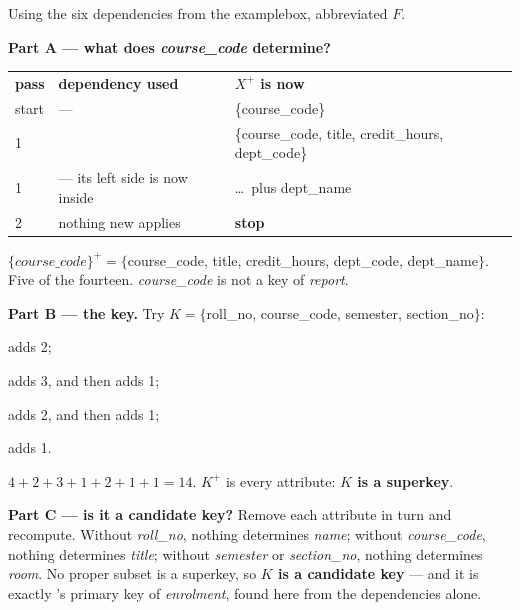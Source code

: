 \begin{worked}
Using the six dependencies from the examplebox, abbreviated
$F$.

\medskip
\textbf{Part A --- what does \textit{course\_code} determine?}

\smallskip
\begin{tabular}{@{}L{1.4cm}L{6.0cm}L{6.6cm}@{}}
\textbf{pass} & \textbf{dependency used} & \textbf{$X^{+}$ is now} \\
start & --- & \{course\_code\} \\
1 &  & \{course\_code,
  title, credit\_hours, dept\_code\} \\
1 &  --- its left side is now inside & \dots\ plus
  dept\_name \\
2 & nothing new applies & \textbf{stop} \\
\end{tabular}

\smallskip
$\{\mathit{course\_code}\}^{+} = \{$course\_code, title, credit\_hours,
dept\_code, dept\_name$\}$. Five of the fourteen. \textit{course\_code} is not a
key of \textit{report}.

\medskip
\textbf{Part B --- the key.} Try $K = \{$roll\_no, course\_code, semester,
section\_no$\}$:
\begin{tight}
  \item {} adds 2;
  \item {} adds 3, and then
         adds 1;
  \item {} adds 2, and
        then  adds 1;
  \item {} adds 1.
\end{tight}
$4 + 2 + 3 + 1 + 2 + 1 + 1 = 14$. $K^{+}$ is every attribute: \textbf{$K$ is a
superkey}.

\medskip
\textbf{Part C --- is it a candidate key?} Remove each attribute in turn and
recompute. Without \textit{roll\_no}, nothing determines \textit{name}; without
\textit{course\_code}, nothing determines \textit{title}; without
\textit{semester} or \textit{section\_no}, nothing determines \textit{room}. No
proper subset is a superkey, so \textbf{$K$ is a candidate key} --- and it is
exactly 's primary key of \textit{enrolment}, found here from
the dependencies alone.
\end{worked}


